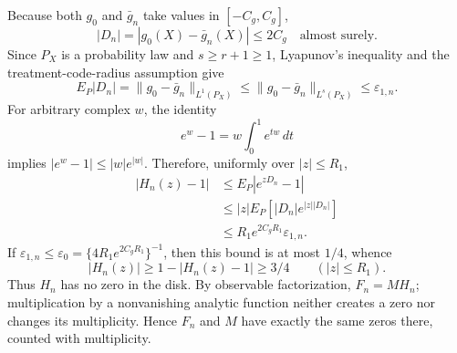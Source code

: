 Because both \(g_0\) and \(\bar g_n\) take values in \([-C_g,C_g]\),
\[
 |D_n|=|g_0(X)-\bar g_n(X)|\le2C_g
 \quad\text{almost surely}.
\]
Since \(P_X\) is a probability law and \(s\ge r+1\ge1\), Lyapunov's inequality and the treatment-code-radius assumption give
\[
 E_P|D_n|=\|g_0-\bar g_n\|_{L^1(P_X)}
 \le\|g_0-\bar g_n\|_{L^s(P_X)}
 \le\varepsilon_{1,n}.
\]
For arbitrary complex \(w\), the identity
\[
 e^w-1=w\int_0^1e^{tw}\,dt
\]
implies \(|e^w-1|\le |w|e^{|w|}\).  Therefore, uniformly over \(|z|\le R_1\),
\[
 \begin{aligned}
 |H_n(z)-1|
 &\le E_P|e^{zD_n}-1|\\
 &\le |z|E_P[|D_n|e^{|z||D_n|}]\\
 &\le R_1e^{2C_gR_1}\varepsilon_{1,n}.
 \end{aligned}
\]
If \(\varepsilon_{1,n}\le\varepsilon_0=\{4R_1e^{2C_gR_1}\}^{-1}\), then this bound is at most \(1/4\), whence
\[
 |H_n(z)|\ge1-|H_n(z)-1|\ge3/4
 \qquad (|z|\le R_1).
\]
Thus \(H_n\) has no zero in the disk.  By observable factorization, \(F_n=M H_n\); multiplication by a nonvanishing analytic function neither creates a zero nor changes its multiplicity.  Hence \(F_n\) and \(M\) have exactly the same zeros there, counted with multiplicity.